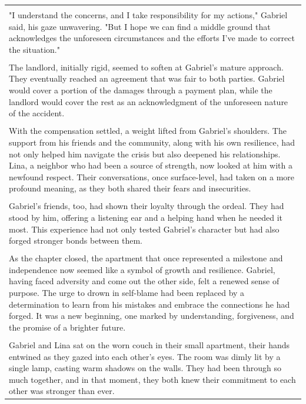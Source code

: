 \begin{small}
\begin{longtable}{p{}}
\\
\\
"I understand the concerns, and I take responsibility for my actions," Gabriel said, his gaze unwavering. "But I hope we can find a middle ground that acknowledges the unforeseen circumstances and the efforts I've made to correct the situation."
\\
\\
The landlord, initially rigid, seemed to soften at Gabriel's mature approach. They eventually reached an agreement that was fair to both parties. Gabriel would cover a portion of the damages through a payment plan, while the landlord would cover the rest as an acknowledgment of the unforeseen nature of the accident.
\\
\\
With the compensation settled, a weight lifted from Gabriel's shoulders. The support from his friends and the community, along with his own resilience, had not only helped him navigate the crisis but also deepened his relationships. Lina, a neighbor who had been a source of strength, now looked at him with a newfound respect. Their conversations, once surface-level, had taken on a more profound meaning, as they both shared their fears and insecurities.
\\
\\
Gabriel's friends, too, had shown their loyalty through the ordeal. They had stood by him, offering a listening ear and a helping hand when he needed it most. This experience had not only tested Gabriel's character but had also forged stronger bonds between them.
\\
\\
As the chapter closed, the apartment that once represented a milestone and independence now seemed like a symbol of growth and resilience. Gabriel, having faced adversity and come out the other side, felt a renewed sense of purpose. The urge to drown in self-blame had been replaced by a determination to learn from his mistakes and embrace the connections he had forged. It was a new beginning, one marked by understanding, forgiveness, and the promise of a brighter future.
\\
\\
Gabriel and Lina sat on the worn couch in their small apartment, their hands entwined as they gazed into each other's eyes. The room was dimly lit by a single lamp, casting warm shadows on the walls. They had been through so much together, and in that moment, they both knew their commitment to each other was stronger than ever.

\end{longtable}
\end{small}
